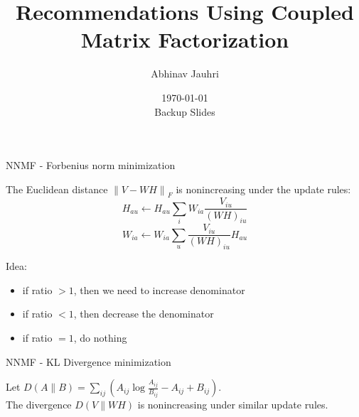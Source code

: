 \documentclass{beamer}
\title{\color{univred} Recommendations Using Coupled Matrix Factorization}
\author{Abhinav Jauhri}
\date{\today \\\vspace{2.5cm} \color{univred} Backup Slides}
\newcommand{\norm}[1]{\ensuremath{\lVert{#1}\rVert}}
\begin{document}
\begin{frame}
    \color{univred}
\titlepage
\end{frame}

\begin{frame}{NNMF - Forbenius norm minimization}
    \begin{theorem}
        The Euclidean distance $\norm{V - WH}_F$ is nonincreasing under the update rules:
        \begin{equation} 
            H_{au} \leftarrow H_{au} \sum_i W_{ia}\frac{V_{iu}}{(WH)_{iu}}
        \end{equation}
        \begin{equation} 
            W_{i a} \leftarrow W_{i a} \sum_u \frac{V_{iu}}{(WH)_{iu}} H_{au}
        \end{equation}
    \end{theorem}
    Idea: \begin{itemize}
        \item if ratio $> 1$, then we need to increase denominator
        \item if ratio $< 1$, then decrease the denominator
        \item if ratio $= 1$, do nothing
    \end{itemize}
\end{frame}
\begin{frame}{NNMF - KL Divergence minimization}
    \begin{theorem}
        Let $D(A\|B) = \sum_{ij} (A_{ij} \log{\frac{A_{ij}}{B_{ij}}} - A_{ij} + B_{ij})$.\\
        The divergence $D(V\|WH)$ is nonincreasing under similar update rules.
    \end{theorem}
\end{frame}
\end{document}
